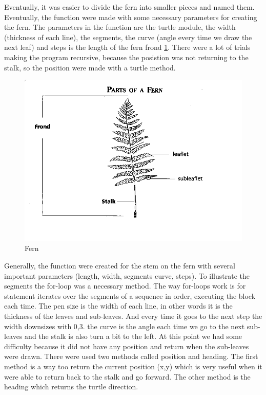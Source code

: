 \documentclass[titlepage]{article}
\begin{document}
Eventually, it was easier to divide the fern into smaller pieces and named them. Eventually, the function were made with some necessary parameters for creating the fern. The parameters in the function are the turtle module, the width (thickness of each line), the segments, the curve (angle every time we draw the next leaf) and steps is the length of the fern frond \ref{fig:frond}. There were a lot of trials making the program recursive, because the posistion was not returning to the stalk, so the position were made with a turtle method.\par
\begin{figure}[H]
  \centering
  \includegraphics[width=\textwidth]{Fern}
  \caption{Fern}
  \label{fig:frond}
\end{figure}
Generally, the function were created for the stem on the fern with several important parameters (length, width, segments curve, steps). To illustrate the segments the for-loop was a necessary method. The way for-loops work is for statement iterates over the segments of a sequence in order, executing the block each time. The pen size is the width of each line, in other words it is the thickness of the leaves and sub-leaves. And every time it goes to the next step the width downsizes with 0,3. the curve is the angle each time we go to the next sub-leaves and the stalk is also turn a bit to the left. At this point we had some difficulty because it did not have any position and return when the sub-leaves were drawn. There were used two methods called position and heading. The first method is a way too return the current position (x,y) which is very useful when it were able to return back to the stalk and go forward. The other method is the heading which returns the turtle direction.
\end{document}
